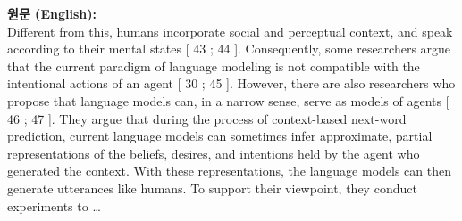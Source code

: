 \documentclass[12pt,a4paper]{article}
\begin{document}
\begin{mdframed}[style=orig]
\noindent\textbf{\small 원문 (English):}\\[2pt]
\small Different from this, humans incorporate social and perceptual context, and speak according to their mental states [ 43 ; 44 ]. Consequently, some researchers argue that the current paradigm of language modeling is not compatible with the intentional actions of an agent [ 30 ; 45 ]. However, there are also researchers who propose that language models can, in a narrow sense, serve as models of agents [ 46 ; 47 ]. They argue that during the process of context-based next-word prediction, current language models can sometimes infer approximate, partial representations of the beliefs, desires, and intentions held by the agent who generated the context. With these representations, the language models can then generate utterances like humans. To support their viewpoint, they conduct experiments to \ldots
\end{mdframed}
\vspace{0.4em}
\end{document}
